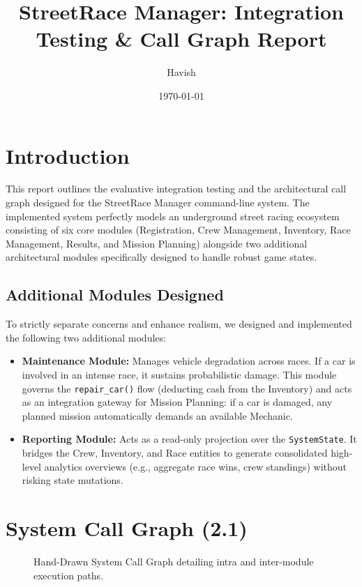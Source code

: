 \documentclass[12pt,a4paper]{article}
\title{\textbf{StreetRace Manager: Integration Testing \& Call Graph Report}}
\author{Havish}
\date{\today}
\begin{document}
\maketitle

\section{Introduction}
This report outlines the evaluative integration testing and the architectural call graph designed for the StreetRace Manager command-line system. The implemented system perfectly models an underground street racing ecosystem consisting of six core modules (Registration, Crew Management, Inventory, Race Management, Results, and Mission Planning) alongside two additional architectural modules specifically designed to handle robust game states.

\subsection{Additional Modules Designed}
To strictly separate concerns and enhance realism, we designed and implemented the following two additional modules:
\begin{itemize}
    \item \textbf{Maintenance Module:} Manages vehicle degradation across races. If a car is involved in an intense race, it sustains probabilistic damage. This module governs the \texttt{repair\_car()} flow (deducting cash from the Inventory) and acts as an integration gateway for Mission Planning: if a car is damaged, any planned mission automatically demands an available Mechanic.
    \item \textbf{Reporting Module:} Acts as a read-only projection over the \texttt{SystemState}. It bridges the Crew, Inventory, and Race entities to generate consolidated high-level analytics overviews (e.g., aggregate race wins, crew standings) without risking state mutations.
\end{itemize}

\section{System Call Graph (2.1)}
\begin{figure}[h!]
    \centering
    
    
    \caption{Hand-Drawn System Call Graph detailing intra and inter-module execution paths.}
    \label{fig:call_graph}
\end{figure}
\end{document}

